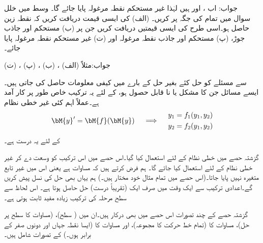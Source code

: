جواب: اب ،  اور  ہیں لہٰذا غیر مستحکم نقطہ مرغولہ پایا جائے گا۔
 \quad وسط میں خلل\\
سوال  میں تمام  کی جگہ  پر کریں۔ (الف)  کی ایسی قیمت دریافت کریں کہ نقطہ زین حاصل ہو۔اسی طرح  کی ایسی قیمتیں دریافت کریں جن پر (ب) مستحکم اور جاذب جوڑ، (پ) مستحکم اور جاذب نقطہ مرغولہ اور (ت) غیر مستحکم نقطہ مرغولہ پایا جائے۔

جواب:مثلاً (الف) ، (ب) ، (پ) ، (ت) 

 سے مسئلے کو حل کئے بغیر حل کے بارے میں کیفی معلومات حاصل کی جاتی ہیں۔ایسے مسائل جن کا  مشکل یا نا قابل حصول ہو، کے لئے یہ ترکیب خاص طور پر کار آمد ہے۔عملاً اہم کئی غیر خطی نظام
\begin{gather}\label{مساوات_نظام_غیر_خطی_ترکیب_مرحلہ_الف}
\begin{aligned}
\bM{y}'=\bM{f}(\bM{y})
\end{aligned}\quad \implies \quad 
\begin{aligned}
y_1&=f_1(y_1,y_2)\\
y_2&=f_2(y_1,y_2)
\end{aligned}
\end{gather}
کے لئے یہ درست ہے۔

گزشتہ حصے میں  خطی نظام کے لئے استعمال کیا گیا۔اس حصے میں اس ترکیب کو وسعت دے کر غیر خطی نظام کے لئے استعمال کیا جائے گا۔ ہم فرض کرتے ہیں کہ مساوات   ہے یعنی اس میں غیر تابع متغیرہ   نہیں پایا جاتا۔(اس حصے میں تمام مثال خود مختار ہیں۔) ہم یہاں بھی حل کی نسل پیش کریں گے۔اعدادی ترکیب سے ایک وقت میں صرف ایک (تقریباً درست) حل حاصل ہوتا ہے۔ اس لحاظ سے سطح مرحلہ کی ترکیب زیادہ مفید ثابت ہوتی ہے۔

گزشتہ حصے کے چند تصورات اس حصے میں بھی درکار ہیں۔ان میں  ( سطح)،  (مساوات  کا  سطح پر حل)، مساوات  کا  (تمام خط حرکت کا مجموعہ)،  اور مساوات  کا  (ایسا نقطہ  جہاں  اور  دونوں صفر کے برابر ہوں۔) کے تصورات شامل ہیں۔

